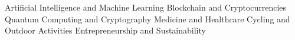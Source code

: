 

\begin{cvinterests}

  \cvinterest
    {Artificial Intelligence and Machine Learning} %
  \cvinterest
    {Blockchain and Cryptocurrencies} %
  \cvinterest
    {Quantum Computing and Cryptography} %
  \cvinterest
    {Medicine and Healthcare} %
  \cvinterest
    {Cycling and Outdoor Activities} %
  \cvinterest
    {Entrepreneurship and Sustainability} %


\end{cvinterests}
